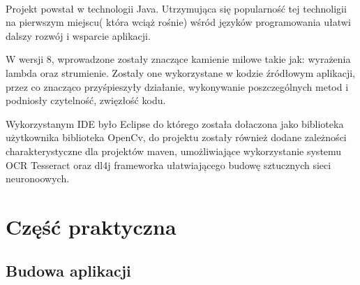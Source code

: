 \documentclass[a4paper,12pt]{article}
\begin{document}
		\paragraph{} Projekt powstał w technologii Java. Utrzymująca się popularność tej technoligii na pierwszym miejscu( która wciąż rośnie) wśród języków programowania ułatwi dalszy rozwój i wsparcie aplikacji.  \par
        W wersji 8, wprowadzone zostały znaczące kamienie milowe takie jak: wyrażenia lambda oraz strumienie. Zostały one wykorzystane w kodzie źródłowym aplikacji, przez co znacząco przyśpieszyły działanie, wykonywanie poszczególnych metod i podniosły czytelność, zwięzłość kodu. \par
        Wykorzystanym IDE było Eclipse do którego została dołaczona jako biblioteka użytkownika biblioteka OpenCv, do projektu zostały również dodane zależności charakterystyczne dla projektów maven, umożliwiające wykorzystanie systemu OCR Tesseract oraz dl4j frameworka ułatwiającego budowę sztucznych sieci neuronoowych. 

        \newpage
        
\section{Część praktyczna}
	\subsection{Budowa aplikacji}
\end{document}
